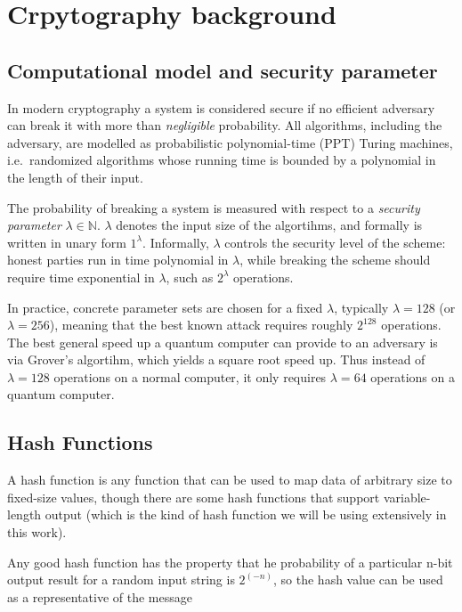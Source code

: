 \chapter{Crpytography background}

\section{Computational model and security parameter}

In modern cryptography a system is considered secure if no efficient
adversary can break it with more than \emph{negligible} probability.
All algorithms, including the adversary, are modelled as probabilistic
polynomial-time (PPT) Turing machines, i.e.\ randomized algorithms
whose running time is bounded by a polynomial in the length of their
input.

The probability of breaking a system is measured with respect to a
\emph{security parameter} $\lambda \in \mathbb{N}$. $\lambda$ denotes the input size of the algortihms, and formally is written in unary form $1^\lambda$. Informally, $\lambda$
controls the security level of the scheme: honest parties run in time
polynomial in $\lambda$, while breaking the scheme should require time
exponential in $\lambda$, such as $2^\lambda$ operations.


In practice, concrete parameter sets are chosen for a fixed
$\lambda$, typically $\lambda = 128$ (or $\lambda = 256$), meaning that the best known
attack requires roughly $2^{128}$ operations. The best general speed up a quantum computer can provide to an adversary is via Grover's algortihm, which yields a square root speed up. Thus instead of $\lambda = 128$ operations on a normal computer, it only requires $\lambda = 64$ operations on a quantum computer.

\section{Hash Functions}

A hash function is any function that can be used to map data of arbitrary size to fixed-size values, though there are some hash functions that support variable-length output (which is the kind of hash function we will be using extensively in this work).

Any good hash function has the property that he probability of a particular n-bit output result for a random input string is $2^(-n)$, so the hash value can be used as a representative of the message

